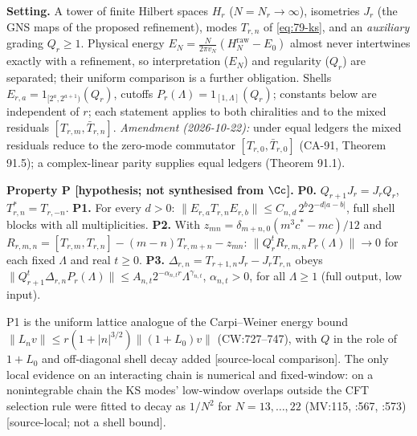\textbf{Setting.}  A tower of finite Hilbert spaces \(H_r\) (\(N=N_r\to\infty\)), isometries
\(J_r\) (the GNS maps of the proposed refinement), modes \(T_{r,n}\) of \eqref{eq:79-ks},
and an \emph{auxiliary} grading \(Q_r\ge1\).  Physical energy
\(E_N=\frac{N}{2\pi v_N}(H^{\mathrm{raw}}_N-E_0)\) almost never intertwines exactly with a
refinement, so interpretation (\(E_N\)) and regularity (\(Q_r\)) are separated; their uniform
comparison is a further obligation.  Shells \(E_{r,a}=1_{[2^a,2^{a+1})}(Q_r)\), cutoffs
\(P_r(\Lambda)=1_{[1,\Lambda]}(Q_r)\); constants below are independent of \(r\); each
statement applies to both chiralities and to the mixed residuals \([T_{r,m},\bar T_{r,n}]\).  \emph{Amendment (2026-10-22):}
under equal ledgers the mixed residuals reduce to the zero-mode commutator \([T_{r,0},\bar T_{r,0}]\) (CA-91, Theorem 91.5);
a complex-linear parity supplies equal ledgers (Theorem 91.1).

\textbf{Property P [hypothesis; not synthesised from \(\Cc\)].}
\textbf{P0.} \(Q_{r+1}J_r=J_rQ_r\), \(T_{r,n}^*=T_{r,-n}\).
\textbf{P1.} For every \(d>0\): \(\|E_{r,a}T_{r,n}E_{r,b}\|\le C_{n,d}\,2^b2^{-d|a-b|}\),
full shell blocks with all multiplicities.
\textbf{P2.} With \(z_{mn}=\delta_{m+n,0}(m^3c^*-mc)/12\) and
\(R_{r,m,n}=[T_{r,m},T_{r,n}]-(m-n)T_{r,m+n}-z_{mn}\): \(\|Q_r^tR_{r,m,n}P_r(\Lambda)\|\to0\)
for each fixed \(\Lambda\) and real \(t\ge0\).
\textbf{P3.} \(\Delta_{r,n}=T_{r+1,n}J_r-J_rT_{r,n}\) obeys
\(\|Q_{r+1}^t\Delta_{r,n}P_r(\Lambda)\|\le A_{n,t}2^{-\alpha_{n,t}r}\Lambda^{\gamma_{n,t}}\),
\(\alpha_{n,t}>0\), for all \(\Lambda\ge1\) (full output, low input).

P1 is the uniform lattice analogue of the Carpi--Weiner energy bound
\(\|L_nv\|\le r(1+|n|^{3/2})\|(1+L_0)v\|\) (CW:727--747), with \(Q\) in the role of
\(1+L_0\) and off-diagonal shell decay added [source-local comparison].  The only local
evidence on an interacting chain is numerical and fixed-window: on a nonintegrable chain
the KS modes' low-window overlaps outside the CFT selection rule were fitted to decay as
\(1/N^2\) for \(N=13,\dots,22\) (MV:115, :567, :573) [source-local; not a shell bound].

